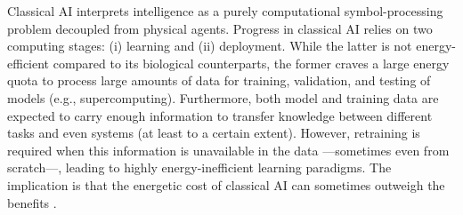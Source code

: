 Classical AI interprets intelligence as a purely computational symbol-processing problem decoupled from physical agents. Progress in classical AI relies on two computing stages: (i) learning and (ii) deployment. While the latter is not energy-efficient compared to its biological counterparts, the former craves a large energy quota to process large amounts of data for training, validation, and testing of models (e.g., supercomputing). Furthermore, both model and training data are expected to carry enough information to transfer knowledge between different tasks and even systems (at least to a certain extent). However, retraining is required when this information is unavailable in the data ---sometimes even from scratch---, leading to highly energy-inefficient learning paradigms. The implication is that the energetic cost of classical AI can sometimes outweigh the benefits \cite{Strubell2019EnergyAP}.

